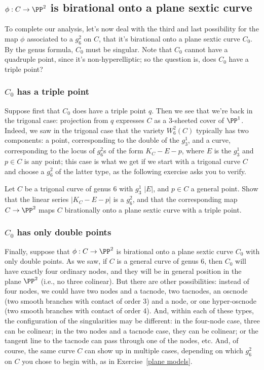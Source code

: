 \subsection{$\phi : C \to \PP^2$ is birational onto a plane sextic curve}

To complete our analysis, let's now deal with the third and last possibility for the map $\phi$ associated to a $g^2_6$ on $C$, that it's birational onto a plane sextic curve $C_0$. By the genus formula, $C_0$ must be singular. Note that $C_0$ cannot have a quadruple point, since it's non-hyperelliptic; so the question is, does $C_0$ have a triple point?

\subsubsection{$C_0$ has a triple point} Suppose first that $C_0$ does have a triple point $q$. Then we see that we're back in the trigonal case: projection from $q$ expresses $C$ as a 3-sheeted cover of $\PP^1$. Indeed, we saw in the trigonal case that the variety $W^2_6(C)$ typically has two components: a point, corresponding to the double of the $g^1_3$, and a curve, corresponding to the locus of $g^2_6$s of the form $K_C - E - p$, where $E$ is the $g^1_3$ and $p \in C$ is any point; this case is what we get if we start with a trigonal curve $C$ and choose a $g^2_6$ of the latter type, as the following exercise asks you to verify.


\begin{exercise}
Let $C$ be a trigonal curve of genus 6 with $g^1_3$ $|E|$, and $p \in C$ a general point. Show that the linear series $|K_C - E-p|$ is a $g^2_6$, and that the corresponding map $C \to \PP^2$ maps $C$ birationally onto a plane sextic curve with a triple point.
\end{exercise}

\subsubsection{$C_0$ has only double points}
Finally, suppose that $\phi : C \to \PP^2$ is birational onto a plane sextic curve $C_0$ with only double points. As we saw, if $C$ is a general curve of genus 6, then $C_0$ will have exactly four ordinary nodes, and they will be in general position in the plane $\PP^2$ (i.e., no three colinear). But there are other possibilities: instead of four nodes, we could have two nodes and a tacnode, two tacnodes, an oscnode (two smooth branches with contact of order 3) and a node, or one hyper-oscnode (two smooth branches with contact of order 4). And, within each of these types, the configuration of the singularities may be different: in the four-node case, three can be colinear; in the two nodes and a tacnode case, they can be colinear; or the tangent line to the tacnode can pass through one of the nodes, etc. And, of course, the same curve $C$ can show up in multiple cases, depending on which $g^2_6$ on $C$ you chose to begin with, as in Exercise~\ref{plane models}. 


